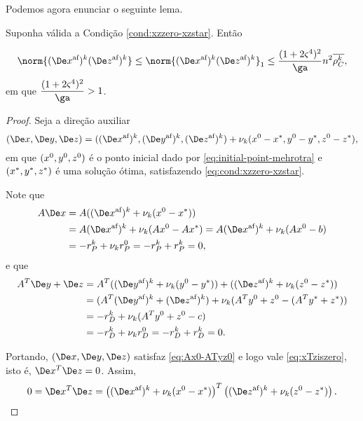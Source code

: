 Podemos agora enunciar o seguinte lema.
\begin{lema}\label{lemma:boundDxDzaff}
Suponha válida a Condição  \ref{cond:xzzero-xzstar}. Então 

\begin{equation}
	\label{eq:normDxDzaff}
			\norm{ \dekx  \dekz  } \leq \norm{ \dekx  \dekz  }_{1}  \leq  \frac{(1 + 2\bdxzstar^{4})^{2} }{\ga} n^{2}\rhoCkb,
\end{equation}
em que $\dfrac{(1 + 2\bdxzstar^{4})^{2} }{\ga}>\num{1}$.
\end{lema}
\begin{proof}
	Seja a direção  auxiliar
	\[
		(\Dex,\Dey,\Dez)  = ( \dekx,  \deky  ,  \dekz  ) + \nuk (\xzero - \xstar,\yzero - \ystar,\zzero - \zstar), 
	\]
em que $(x^0,y^0,z^0)$ é o ponto inicial dado por \eqref{eq:initial-point-mehrotra} e  $(x^*,y^*,z^*)$ é uma  solução ótima, satisfazendo \eqref{eq:cond:xzzero-xzstar}.
	
	Note que 
\[
\begin{aligned}
A\Dex & = A( \dekx + \nuk (\xzero - \xstar)) \\
& =  A\dekx + \nuk (A\xzero - A\xstar)  =  A\dekx + \nuk (A\xzero - b)\\
& = -r_{P}^{k}  + \nuk  r_{P}^{0}   = -r_{P}^{k} + r_{P}^{k} = 0,  
\end{aligned}
\]
e que
\[
\begin{aligned}
A^{T}\Dey + \Dez  & = 	A^{T}(\deky + \nuk (\yzero - \ystar)) + (\dekz + \nuk (\zzero - \zstar)) \\
							& = 	(A^{T}\deky  + \dekz) + \nuk (A^{T}\yzero  + \zzero  - (A^{T}\ystar +  \zstar)) \\
							& = 	- r_{D}^{k} + \nuk (A^{T}\yzero  + \zzero  - c) \\
							& = - r_{D}^{k}  + \nuk  r_{D}^{0}   = -r_{D}^{k} + r_{D}^{k} = 0.   
\end{aligned}
\]


Portando, $(\Dex,\Dey,\Dez)$  satisfaz \eqref{eq:Ax0-ATyz0} e logo vale \eqref{eq:xTziszero}, isto é, $\Dex^{T}\Dez = 0$. Assim, 
	\begin{equation}
		\label{eq:DxDzaff1}
			 0 = \Dex^{T}\Dez = \left( \dekx +  \nuk (\xzero - \xstar)\right)^{T}\left(  \dekz   +  \nuk (\zzero - \zstar)\right).
	\end{equation}
	


\end{proof}
